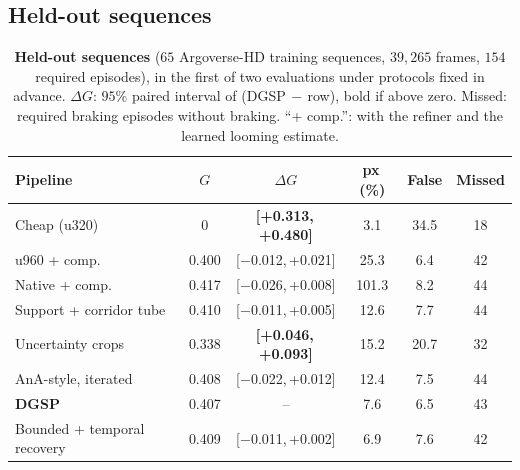 \documentclass[10pt,letterpaper]{article}
\newcommand{\method}{DGSP\xspace}
\newcommand{\G}{G}
\newcommand{\ci}[2]{[#1,\allowbreak\,#2]}
\newcommand{\best}[1]{\textbf{#1}}
\newcommand{\oursrow}{\rowcolor{oursbg}}
\newcommand{\na}{--}
\theoremstyle{remark}
\theoremstyle{plain}
\theoremstyle{definition}
\begin{document}
\subsection{Held-out sequences}
\label{sec:supp_holdout}

\begin{table}[!tbp]
\centering
\caption{\textbf{Held-out sequences} ($65$ Argoverse-HD training sequences, $39{,}265$ frames, $154$ required episodes), in the first of two evaluations under protocols fixed in advance. $\Delta\G$: $95\%$ paired interval of (\method$\,-\,$row), bold if above zero. Missed: required braking episodes without braking. ``+ comp.'': with the refiner and the learned looming estimate.}
\label{tab:holdout}
\footnotesize
\setlength{\tabcolsep}{2.2pt}
\begin{tabular}{@{}lccccc@{}}
\toprule
Pipeline & $\G$ & $\Delta\G$ & px\,(\%) & False & Missed \\
\midrule
Cheap (u320) & 0 & \best{\ci{+0.313}{+0.480}} & 3.1 & 34.5 & 18 \\
u960 + comp. & 0.400 & \ci{$-$0.012}{+0.021} & 25.3 & 6.4 & 42 \\
Native + comp. & 0.417 & \ci{$-$0.026}{+0.008} & 101.3 & 8.2 & 44 \\
Support + corridor tube & 0.410 & \ci{$-$0.011}{+0.005} & 12.6 & 7.7 & 44 \\
Uncertainty crops & 0.338 & \best{\ci{+0.046}{+0.093}} & 15.2 & 20.7 & 32 \\
AnA-style, iterated & 0.408 & \ci{$-$0.022}{+0.012} & 12.4 & 7.5 & 44 \\
\midrule
\oursrow \textbf{\method} & 0.407 & \na & 7.6 & 6.5 & 43 \\
Bounded + temporal recovery & 0.409 & \ci{$-$0.011}{+0.002} & 6.9 & 7.6 & 42 \\
\bottomrule
\end{tabular}
\end{table}
\end{document}
